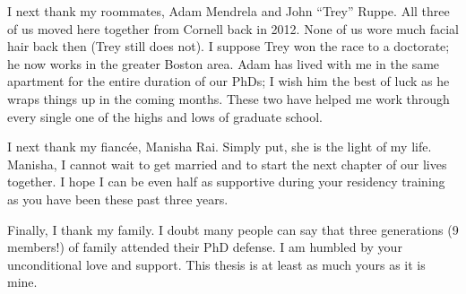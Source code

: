 I next thank my roommates,
Adam Mendrela and John ``Trey'' Ruppe.
All three of us moved here together
from Cornell back in 2012.
None of us wore much facial hair back then
(Trey still does not).
I suppose Trey won the race to a doctorate;
he now works in the greater Boston area.
Adam has lived with me 
in the same apartment
for the entire duration of our PhDs;
I wish him the best of luck
as he wraps things up in the coming months.
These two have helped me
work through every single one 
of the highs and lows
of graduate school.

I next thank my fianc\'{e}e, Manisha Rai.
Simply put,
she is the light of my life.
Manisha,
I cannot wait to get married
and to start the next chapter 
of our lives together.
I hope I can be even half as supportive
during your residency training
as you have been these past three years.

Finally,
I thank my family.
I doubt many people can say
that three generations (9 members!) of family
attended their PhD defense.
I am humbled by your unconditional love and support.
This thesis is at least as much yours as it is mine.
